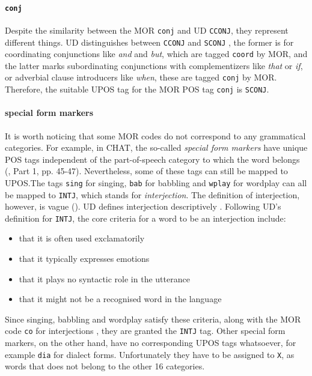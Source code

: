 \paragraph{\texttt{conj}}
Despite the similarity between the MOR \texttt{conj} and UD \texttt{CCONJ}, they represent different things. UD distinguishes between \texttt{CCONJ}  and \texttt{SCONJ} , the former is for coordinating conjunctions like \emph{and} and \emph{but}, which are tagged \texttt{coord} by MOR, and the latter marks subordinating conjunctions with complementizers like \emph{that} or \emph{if}, or adverbial clause introducers like \emph{when}, these are tagged \texttt{conj} by MOR. Therefore, the suitable UPOS tag for the MOR POS tag \texttt{conj} is \texttt{SCONJ}.

\paragraph{special form markers}
It is worth noticing that some MOR codes do not correspond to any grammatical categories. For example, in CHAT, the so-called \emph{special form markers} have unique POS tags independent of the part-of-speech category to which the word belongs (\cite{Macwhinney2000}, Part 1, pp. 45-47). Nevertheless, some of these tags can still be mapped to UPOS.The tags \texttt{sing} for singing, \texttt{bab} for babbling and \texttt{wplay} for wordplay can all be mapped to \texttt{INTJ}, which stands for \emph{interjection}. The definition of interjection, however, is vague (\cite{ameka1992}). UD defines interjection descriptively . Following UD's definition for \texttt{INTJ}, the core criteria for a word  to be an interjection include:
\begin{itemize}
	\item that it is often used exclamatorily
	\item that it typically expresses emotions
	\item that it plays no syntactic role in the utterance
	\item that it might not be a recognised word in the language
\end{itemize}
Since singing, babbling and wordplay satisfy these criteria, along with the MOR code \texttt{co} for interjections , they are granted the \texttt{INTJ} tag. Other special form markers, on the other hand, have no corresponding UPOS tags whatsoever, for example \texttt{dia} for dialect forms. Unfortunately they have to be assigned to \texttt{X}, as words that does not belong to the other 16 categories.

